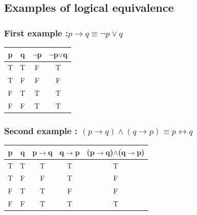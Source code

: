 \documentclass[12pt,a4paper]{article}
\begin{document}
\subsection{Examples of logical equivalence}
\subsubsection{First example :$p \rightarrow q \equiv \neg p \vee q$}
\begin{center}
	\begin{tabular}{cc|cc}
		p & q & $\neg$p & $\neg$p$\vee$q\\
		\hline
		T&T&F&T\\
		T&F&F&F\\
		F&T&T&T\\
		F&F&T&T\\
	\end{tabular}
\end{center}
\subsubsection{Second example : $(p \rightarrow q) \wedge (q \rightarrow p) \equiv p \leftrightarrow q$}
\begin{center}
	\begin{tabular}{cc|ccc}
		p & q & p$\rightarrow$q & q$\rightarrow$p & 							(p$\rightarrow$q)$\wedge$(q$\rightarrow$p)\\
		\hline
		T&T&T&T&T\\
		T&F&F&T&F\\
		F&T&T&F&F\\
		F&F&T&T&T\\
	\end{tabular}
\end{center}
\end{document}
